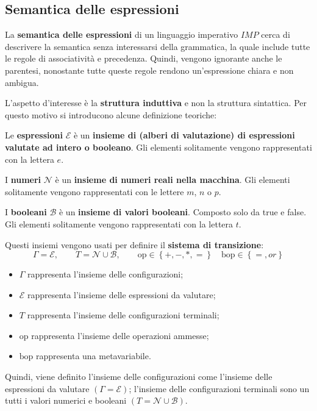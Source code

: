 \documentclass[a4paper]{article}
\begin{document}
	\subsection{Semantica delle espressioni}
	
	La \textcolor{Red3}{\textbf{semantica delle espressioni}} di un linguaggio imperativo $IMP$ cerca di descrivere la semantica senza interessarsi della grammatica, la quale include tutte le regole di associatività e precedenza. Quindi, vengono ignorante anche le parentesi, nonostante tutte queste regole rendono un'espressione chiara e non ambigua.\newline
	
	\noindent
	L'aspetto d'interesse è la \textbf{struttura induttiva} e non la struttura sintattica. Per questo motivo si introducono alcune definizione teoriche:
	\begin{boxdef}
		Le \textcolor{Red3}{\textbf{espressioni}} $\mathcal{E}$ è un \textbf{insieme di (alberi di valutazione) di espressioni valutate ad intero o booleano}. Gli elementi solitamente vengono rappresentati con la lettera $e$.
	\end{boxdef}
	\begin{boxdef}
		I \textcolor{Red3}{\textbf{numeri}} $\mathcal{N}$ è un \textbf{insieme di numeri reali nella macchina}. Gli elementi solitamente vengono rappresentati con le lettere $m$, $n$ o $p$.
	\end{boxdef}
	\begin{boxdef}
		I \textcolor{Red3}{\textbf{booleani}} $\mathcal{B}$ è un \textbf{insieme di valori booleani}. Composto solo da \textsf{true} e \textsf{false}. Gli elementi solitamente vengono rappresentati con la lettera $t$.
	\end{boxdef}
	
	\noindent
	Questi insiemi vengono usati per definire il \textcolor{Red3}{\textbf{sistema di transizione}}:
	\begin{equation*}
		\Gamma = \mathcal{E}, \hspace{2em} T = \mathcal{N} \cup \mathcal{B}, \hspace{2em} \mathrm{op}\in\left\{+,-,*,=\right\} \hspace{1em} \mathrm{bop} \in \left\{=, or\right\}
	\end{equation*}
	\begin{itemize}
		\item $\Gamma$ rappresenta l'insieme delle configurazioni;
		\item $\mathcal{E}$ rappresenta l'insieme delle espressioni da valutare;
		\item $T$ rappresenta l'insieme delle configurazioni terminali;
		\item $\mathrm{op}$ rappresenta l'insieme delle operazioni ammesse;
		\item $\mathrm{bop}$ rappresenta una metavariabile.
	\end{itemize}
	Quindi, viene definito l'insieme delle configurazioni come l'insieme delle espressioni da valutare $\left(\Gamma = \mathcal{E}\right)$; l'insieme delle configurazioni terminali sono un tutti i valori numerici e booleani $\left(T = \mathcal{N} \cup \mathcal{B}\right)$.\newpage
	
\end{document}
